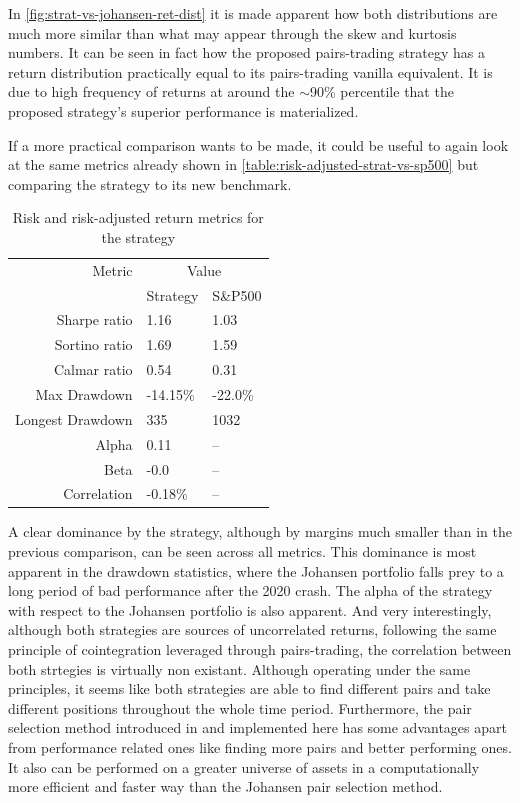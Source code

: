 In \autoref{fig:strat-vs-johansen-ret-dist} it is made apparent how both distributions are much more similar than what may appear through the skew and kurtosis numbers. It can be seen in fact how the proposed pairs-trading strategy has a return distribution practically equal to its pairs-trading vanilla equivalent. It is due to high frequency of returns at around the $\sim$90\% percentile that the proposed strategy's superior performance is materialized.    

If a more practical comparison wants to be made, it could be useful to again look at the same metrics already shown in \autoref{table:risk-adjusted-strat-vs-sp500} but comparing the strategy to its new benchmark. 

\begin{table}[ht]
    \centering
    \begin{tabular}{rll}
        \toprule
        Metric & \multicolumn{2}{c}{Value} \\ 
        \cmidrule(lr){2-3}
            & Strategy & S\&P500 \\
        \midrule
        Sharpe ratio & 1.16 & 1.03 \\
        Sortino ratio & 1.69 & 1.59 \\
        Calmar ratio & 0.54 & 0.31 \\
        Max Drawdown & -14.15\% & -22.0\% \\
        Longest Drawdown & 335 & 1032 \\
        Alpha & 0.11 & -- \\
        Beta & -0.0 & -- \\
        Correlation & -0.18\% & -- \\
        \bottomrule
    \end{tabular}
    \caption{Risk and risk-adjusted return metrics for the strategy}
    \label{table:risk-adjusted-strat-vs-johansen}
\end{table}

A clear dominance by the strategy, although by margins much smaller than in the previous comparison, can be seen across all metrics. This dominance is most apparent in the drawdown statistics, where the Johansen portfolio falls prey to a long period of bad performance after the 2020 crash. The alpha of the strategy with respect to the Johansen portfolio is also apparent. And very interestingly, although both strategies are sources of uncorrelated returns, following the same principle of cointegration leveraged through pairs-trading, the correlation between both strtegies is virtually non existant. Although operating under the same principles, it seems like both strategies are able to find different pairs and take different positions throughout the whole time period. Furthermore, the pair selection method introduced in \cite{ioannis_2023} and implemented here has some advantages apart from performance related ones like finding more pairs and better performing ones. It also can be performed on a greater universe of assets in a computationally more efficient and faster way than the Johansen pair selection method. 


